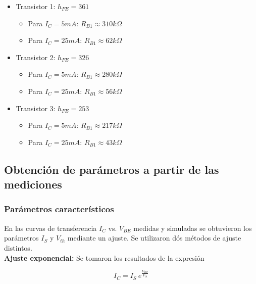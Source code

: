 \documentclass[10pt,spanish,a4paper,openany,notitlepage]{article}
\begin{document}
\begin{itemize}

\item{Transistor 1:} $h_{FE} = 361$

\begin{itemize}
\item{Para $I_C = 5 \unit{mA}$}: $R_{B1} \approx 310 \unit{k\Omega}$
\item{Para $I_C = 25 \unit{mA}$}: $R_{B1} \approx  62\unit{k\Omega}$
\end{itemize}

\item{Transistor 2:} $h_{FE} = 326$

\begin{itemize}
\item{Para $I_C = 5 \unit{mA}$}: $R_{B1} \approx  280\unit{k\Omega}$
\item{Para $I_C = 25 \unit{mA}$}: $R_{B1} \approx  56\unit{k\Omega}$
\end{itemize}

\item{Transistor 3:} $h_{FE} = 253$

\begin{itemize}
\item{Para $I_C = 5 \unit{mA}$}: $R_{B1} \approx  217\unit{k\Omega}$
\item{Para $I_C = 25 \unit{mA}$}: $R_{B1} \approx  43\unit{k\Omega}$
\end{itemize}

\end{itemize}

\subsection{Obtención de parámetros a partir de las mediciones}

\subsubsection{Parámetros característicos}

En las curvas de transferencia $I_C$ vs. $V_{BE}$ medidas y simuladas se obtuvieron los parámetros $I_S$ y $V_{th}$ mediante un ajuste. Se utilizaron dós métodos de ajuste distintos.\\

\textbf{Ajuste exponencial:} Se tomaron los resultados de la expresión

\[ \displaystyle I_C  = I_S\ e^{\frac{V_{BE}}{V_{th}}} \]
\end{document}

